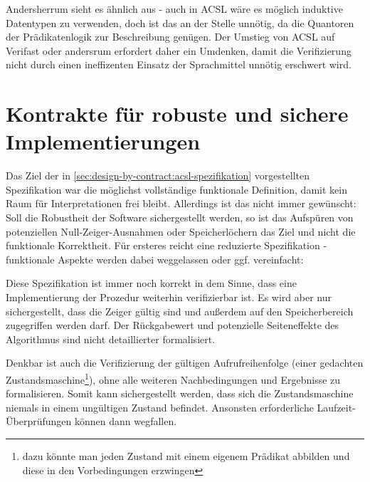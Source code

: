 Andersherrum sieht es ähnlich aus - auch in ACSL wäre es möglich induktive Datentypen zu verwenden, doch
ist das an der Stelle unnötig, da die Quantoren der Prädikatenlogik zur Beschreibung genügen. 
Der Umstieg von ACSL auf Verifast oder andersrum erfordert daher ein Umdenken, damit die Verifizierung 
nicht durch einen ineffizenten Einsatz der Sprachmittel unnötig erschwert wird.




\section{Kontrakte für robuste und sichere Implementierungen}
\label{sec:design-by-contract:partielle-korrektheit}

Das Ziel der in \ref{sec:design-by-contract:acsl-spezifikation} vorgestellten Spezifikation war die
möglichst vollständige funktionale Definition, damit kein Raum für Interpretationen frei bleibt. Allerdings ist
das nicht immer gewünscht: Soll die Robustheit der Software sichergestellt werden, so ist das Aufspüren 
von potenziellen Null-Zeiger-Ausnahmen oder Speicherlöchern das Ziel und nicht die funktionale
Korrektheit. Für ersteres reicht eine reduzierte Spezifikation - funktionale Aspekte werden dabei 
weggelassen oder ggf. vereinfacht:


 
Diese Spezifikation ist immer noch korrekt in dem Sinne, dass eine Implementierung der Prozedur
weiterhin verifizierbar ist. Es wird aber nur sichergestellt, dass die Zeiger gültig sind und außerdem
auf den Speicherbereich zugegriffen werden darf. Der Rückgabewert und potenzielle Seiteneffekte des 
Algorithmus sind nicht detaillierter formalisiert.

Denkbar ist auch die Verifizierung der gültigen Aufrufreihenfolge (einer gedachten Zustandsmaschine\footnote{dazu
könnte man jeden Zustand mit einem eigenem Prädikat abbilden und diese in den Vorbedingungen erzwingen}),
ohne alle weiteren Nachbedingungen und Ergebnisse zu formalisieren. Somit kann sichergestellt werden,
dass sich die Zustandsmaschine niemals in einem ungültigen Zustand befindet. Ansonsten erforderliche
Laufzeit-Überprüfungen können dann wegfallen.
